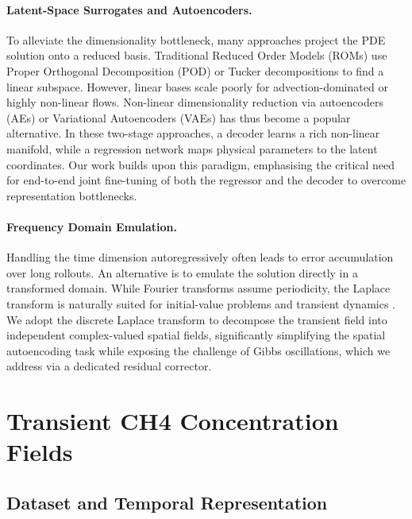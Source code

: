 \documentclass[a4paper, twocolumn]{article}
\begin{document}
\paragraph{Latent-Space Surrogates and Autoencoders.}
To alleviate the dimensionality bottleneck, many approaches project the PDE solution onto a reduced basis. Traditional Reduced Order Models (ROMs) use Proper Orthogonal Decomposition (POD) or Tucker decompositions \cite{ammar2024hybrid, kolda2009tensor} to find a linear subspace. However, linear bases scale poorly for advection-dominated or highly non-linear flows. Non-linear dimensionality reduction via autoencoders (AEs) or Variational Autoencoders (VAEs) \cite{kingma2013vae} has thus become a popular alternative. In these two-stage approaches, a decoder learns a rich non-linear manifold, while a regression network maps physical parameters to the latent coordinates. Our work builds upon this paradigm, emphasising the critical need for end-to-end joint fine-tuning of both the regressor and the decoder to overcome representation bottlenecks.

\paragraph{Frequency Domain Emulation.}
Handling the time dimension autoregressively often leads to error accumulation over long rollouts. An alternative is to emulate the solution directly in a transformed domain. While Fourier transforms assume periodicity, the Laplace transform is naturally suited for initial-value problems and transient dynamics \cite{abate1992fourier}. We adopt the discrete Laplace transform to decompose the transient field into independent complex-valued spatial fields, significantly simplifying the spatial autoencoding task while exposing the challenge of Gibbs oscillations, which we address via a dedicated residual corrector.


\section{Transient CH4 Concentration Fields}
\label{sec:transient}

\subsection{Dataset and Temporal Representation}
\end{document}
